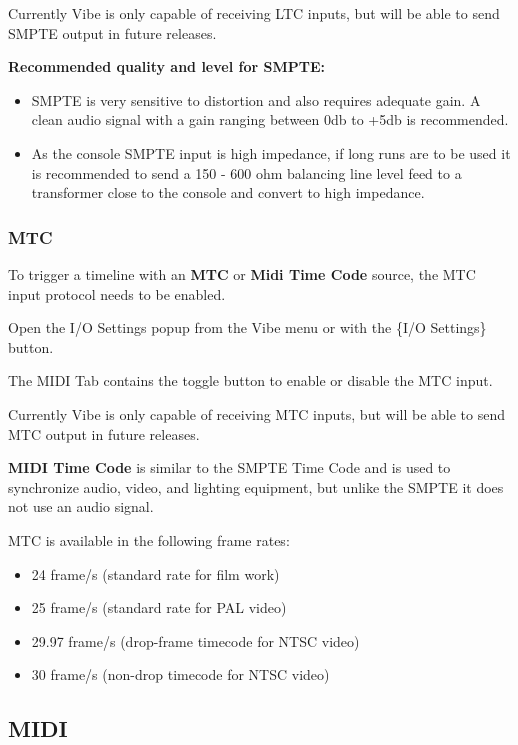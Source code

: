 \documentclass[
]{article}
\begin{document}
{Currently Vibe is only capable of receiving LTC inputs, but will be able to send SMPTE output in future releases.}

\textbf{Recommended quality and level for SMPTE:}

\begin{itemize}
\item
  SMPTE is very sensitive to distortion and also requires adequate gain. A clean audio signal with a gain ranging between 0db to +5db is recommended.
\item
  As the console SMPTE input is high impedance, if long runs are to be used it is recommended to send a 150 - 600 ohm balancing line level feed to a transformer close to the console and convert to high impedance.
\end{itemize}

\hypertarget{mtc}{%
\subsubsection{MTC}\label{mtc}}

To trigger a timeline with an \textbf{MTC} or \textbf{Midi Time Code} source, the MTC input protocol needs to be enabled.

Open the I/O Settings popup from the Vibe menu or with the \{I/O Settings\} button.

The MIDI Tab contains the toggle button to enable or disable the MTC input.

{Currently Vibe is only capable of receiving MTC inputs, but will be able to send MTC output in future releases.}

\textbf{MIDI Time Code} is similar to the SMPTE Time Code and is used to synchronize audio, video, and lighting equipment, but unlike the SMPTE it does not use an audio signal.

MTC is available in the following frame rates:

\begin{itemize}
\item
  24 frame/s (standard rate for film work)
\item
  25 frame/s (standard rate for PAL video)
\item
  29.97 frame/s (drop-frame timecode for NTSC video)
\item
  30 frame/s (non-drop timecode for NTSC video)
\end{itemize}

\hypertarget{MIDI-14.3}{%
\subsection{MIDI}\label{MIDI-14.3}}
\end{document}
